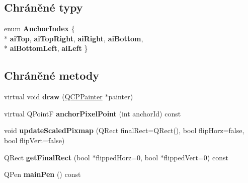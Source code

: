 \subsection*{Chráněné typy}
\begin{DoxyCompactItemize}
\item 
\hypertarget{classQCPItemPixmap_a0ea7f65edb7395e02de521915f221174}{}enum {\bfseries Anchor\+Index} \{ \\*
{\bfseries ai\+Top}, 
{\bfseries ai\+Top\+Right}, 
{\bfseries ai\+Right}, 
{\bfseries ai\+Bottom}, 
\\*
{\bfseries ai\+Bottom\+Left}, 
{\bfseries ai\+Left}
 \}\label{classQCPItemPixmap_a0ea7f65edb7395e02de521915f221174}

\end{DoxyCompactItemize}
\subsection*{Chráněné metody}
\begin{DoxyCompactItemize}
\item 
\hypertarget{classQCPItemPixmap_a879e8076c2db01a38b34cfa73ec95d2f}{}virtual void {\bfseries draw} (\hyperlink{classQCPPainter}{Q\+C\+P\+Painter} $\ast$painter)\label{classQCPItemPixmap_a879e8076c2db01a38b34cfa73ec95d2f}

\item 
\hypertarget{classQCPItemPixmap_a88abce3c1027f371cddcf6dad35ffbb1}{}virtual Q\+Point\+F {\bfseries anchor\+Pixel\+Point} (int anchor\+Id) const \label{classQCPItemPixmap_a88abce3c1027f371cddcf6dad35ffbb1}

\item 
\hypertarget{classQCPItemPixmap_a8bced3027b326b290726cd1979c7cfc6}{}void {\bfseries update\+Scaled\+Pixmap} (Q\+Rect final\+Rect=Q\+Rect(), bool flip\+Horz=false, bool flip\+Vert=false)\label{classQCPItemPixmap_a8bced3027b326b290726cd1979c7cfc6}

\item 
\hypertarget{classQCPItemPixmap_a245ef0c626cab7096a810442f2f6a2d9}{}Q\+Rect {\bfseries get\+Final\+Rect} (bool $\ast$flipped\+Horz=0, bool $\ast$flipped\+Vert=0) const \label{classQCPItemPixmap_a245ef0c626cab7096a810442f2f6a2d9}

\item 
\hypertarget{classQCPItemPixmap_af21085516585c475dc9d839e7f377233}{}Q\+Pen {\bfseries main\+Pen} () const \label{classQCPItemPixmap_af21085516585c475dc9d839e7f377233}

\end{DoxyCompactItemize}
